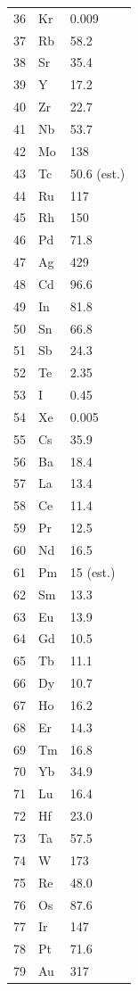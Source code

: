 \documentclass[12pt,a4paper]{article}
\begin{document}
\begin{longtable}{p{0.6cm}p{1.2cm}p{1.5cm}}
		36 & Kr & 0.009 \\
		37 & Rb & 58.2 \\
		38 & Sr & 35.4 \\
		39 & Y  & 17.2 \\
		40 & Zr & 22.7 \\
		41 & Nb & 53.7 \\
		42 & Mo & 138 \\
		43 & Tc & 50.6 (est.) \\
		44 & Ru & 117 \\
		45 & Rh & 150 \\
		46 & Pd & 71.8 \\
		47 & Ag & 429 \\
		48 & Cd & 96.6 \\
		49 & In & 81.8 \\
		50 & Sn & 66.8 \\
		51 & Sb & 24.3 \\
		52 & Te & 2.35 \\
		53 & I  & 0.45 \\
		54 & Xe & 0.005 \\
		55 & Cs & 35.9 \\
		56 & Ba & 18.4 \\
		57 & La & 13.4 \\
		58 & Ce & 11.4 \\
		59 & Pr & 12.5 \\
		60 & Nd & 16.5 \\
		61 & Pm & 15 (est.) \\
		62 & Sm & 13.3 \\
		63 & Eu & 13.9 \\
		64 & Gd & 10.5 \\
		65 & Tb & 11.1 \\
		66 & Dy & 10.7 \\
		67 & Ho & 16.2 \\
		68 & Er & 14.3 \\
		69 & Tm & 16.8 \\
		70 & Yb & 34.9 \\
		71 & Lu & 16.4 \\
		72 & Hf & 23.0 \\
		73 & Ta & 57.5 \\
		74 & W  & 173 \\
		75 & Re & 48.0 \\
		76 & Os & 87.6 \\
		77 & Ir & 147 \\
		78 & Pt & 71.6 \\
		79 & Au & 317 \\

\end{longtable}
\end{document}
